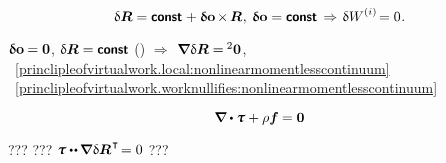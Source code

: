 \begin{otherlanguage}{russian}


\nopagebreak\vspace{-0.2em}\begin{equation}\label{princlipleofvirtualwork.worknullifies:nonlinearmomentlesscontinuum}
\variation{\bm{R}} = \boldconst \hspace{.1ex} + \varvector{o} \hspace{-0.2ex} \times \hspace{-0.2ex} \bm{R} \hspace{.1ex}, \:
\varvector{o} = \boldconst
\hspace{.4ex}\Rightarrow\hspace{.2ex}
\variation{\internalwork} \hspace{-0.2ex} = 0 \hspace{.1ex}.
\end{equation}

\vspace{-0.1em}  ${\bm{\updelta}\hspace{-0.125ex}\bm{\mathrm{\bm{o}}} \hspace{-0.1ex} = \bm{0}}$, ${\variation{\bm{R}} = \boldconst}$ () ${\Rightarrow}$~${\hspace{-0.2ex}\boldnabla \hspace{.1ex} \variation{\bm{R}} = \hspace{-0.12ex} {^2\bm{0}}}$,
~\eqref{princlipleofvirtualwork.local:nonlinearmomentlesscontinuum}
~\eqref{princlipleofvirtualwork.worknullifies:nonlinearmomentlesscontinuum}

\nopagebreak\vspace{-0.2em}\begin{equation*}
\boldnabla \dotp \cauchystress + \rho \bm{f} \hspace{-0.1ex} = \bm{0}
\end{equation*}

\vspace{-0.5em} \noindent ???  ??? ${\cauchystress \dotdotp \hspace{-0.12ex} \boldnabla \hspace{.1ex} \variation{\bm{R}}^{\hspace{.16ex}\T} \hspace{-0.32ex} = 0}$ ???


\end{otherlanguage}

